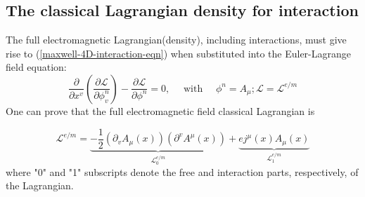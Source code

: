 \subsection{The classical Lagrangian density for interaction}
The full electromagnetic Lagrangian(density), including interactions, must give rise to (\ref{maxwell-4D-interaction-eqn}) when substituted into the Euler-Lagrange field equation:
$$
\frac{\partial}{\partial x^{v}}\left(\frac{\partial \mathcal{L}}{\partial \phi_{v}^{n}}\right)-\frac{\partial \mathcal{L}}{\partial \phi^{n}}=0, \quad \text { with } \quad \phi^{n}=A_{\mu} ; \mathcal{L}=\mathcal{L}^{e / m}
$$
One can prove that the full electromagnetic field classical Lagrangian is
\begin{qt}
\begin{equation}
\mathcal{L}^{e / m}=\underbrace{-\frac{1}{2}\left(\partial_{v} A_{\mu}(x)\right)\left(\partial^{v} A^{\mu}(x)\right)}_{\mathcal{L}_{0}^{e / m}}+ \underbrace{e j^{\mu}(x) A_{\mu}(x)}_{\mathcal{L}_{1}^{e / m}}
\label{full-electromagnetic-field-classical-lagrangian}
\end{equation}
where "0" and "1" subscripts denote the free and interaction parts, respectively, of the Lagrangian.
\end{qt}
